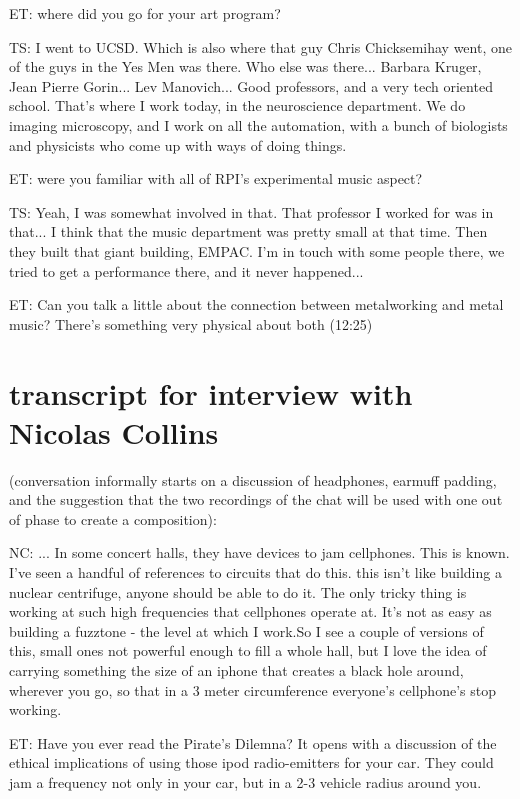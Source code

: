 ET: where did you go for your art program? 

TS: I went to UCSD. Which is also where that guy Chris Chicksemihay went, one of the guys in the Yes Men was there. Who else was there... Barbara Kruger, Jean Pierre Gorin... Lev Manovich... Good professors, and a very tech oriented school. That's where I work today, in the neuroscience department. We do imaging microscopy, and I work on all the automation, with a bunch of biologists and physicists who come up with ways of doing things. 

ET: were you familiar with all of RPI's experimental music aspect? 

TS: Yeah, I was somewhat involved in that. That professor I worked for was in that... I think that the music department was pretty small at that time. Then they built that giant building, EMPAC. I'm in touch with some people there, we tried to get a performance there, and it never happened... 

ET: Can you talk a little about the connection between metalworking and metal music? There's something very physical about both (12:25) 

\section{transcript for interview with Nicolas Collins}

(conversation informally starts on a discussion of headphones, earmuff padding, and the suggestion that the two recordings of the chat will be used with one out of phase to create a composition): 

NC: ... In some concert halls, they have devices to jam cellphones. This is known. I've seen a handful of references to circuits that do this. this isn't like building a nuclear centrifuge, anyone should be able to do it. The only tricky thing is working at such high frequencies that cellphones operate at. It's not as easy as building a fuzztone - the level at which I work.So I see a couple of versions of this, small ones not powerful enough to fill a whole hall, but I love the idea of carrying something the size of an iphone that creates a black hole around, wherever you go, so that in a 3 meter circumference everyone's cellphone's stop working. 

ET: Have you ever read the Pirate's Dilemna? It opens with a discussion of the ethical implications of using those ipod radio-emitters for your car. They could jam a frequency not only in your car, but in a 2-3 vehicle radius around you.

